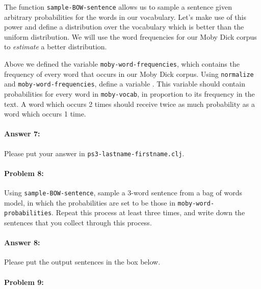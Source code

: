 \documentclass[10pt]{article}
\newenvironment{AnswerBox}{\begin{mdframed}[style=simple]}{\end{mdframed}}
\newcommand{\required}[1]{{\color{blue}{#1}}}
\newcommand{\PSnum}{3}
\begin{document}
The function \texttt{sample-BOW-sentence} allows us to sample a
sentence given arbitrary probabilities for the words in our
vocabulary. Let's make use of this power and define a distribution
over the vocabulary which is better than the uniform distribution. We
will use the word frequencies for our Moby Dick corpus to
\emph{estimate} a better distribution.

Above we defined the variable \texttt{moby-word-frequencies}, which
contains the frequency of every word that occurs in our Moby Dick
corpus. Using \texttt{normalize} and \texttt{moby-word-frequencies},
define a variable \required{\texttt{moby-word-probabilities}}. This variable
should contain probabilities for every word in \texttt{moby-vocab}, in
proportion to its frequency in the text. A word which occurs 2 times
should receive twice as much probability as a word which occurs 1
time.

\paragraph{Answer 7:} Please put your answer in
\texttt{ps\PSnum-lastname-firstname.clj}.

\hrulefill %

\paragraph{Problem 8:}

Using \texttt{sample-BOW-sentence}, sample a 3-word sentence from a
bag of words model, in which the probabilities are set to be those in
\texttt{moby-word-probabilities}. Repeat this process at least three
times, and write down the sentences that you collect through this
process.

\paragraph{Answer 8:} Please put the output sentences in the box below.

\begin{AnswerBox}%


\end{AnswerBox}%

\hrulefill %

\paragraph{Problem 9:}
\end{document}
